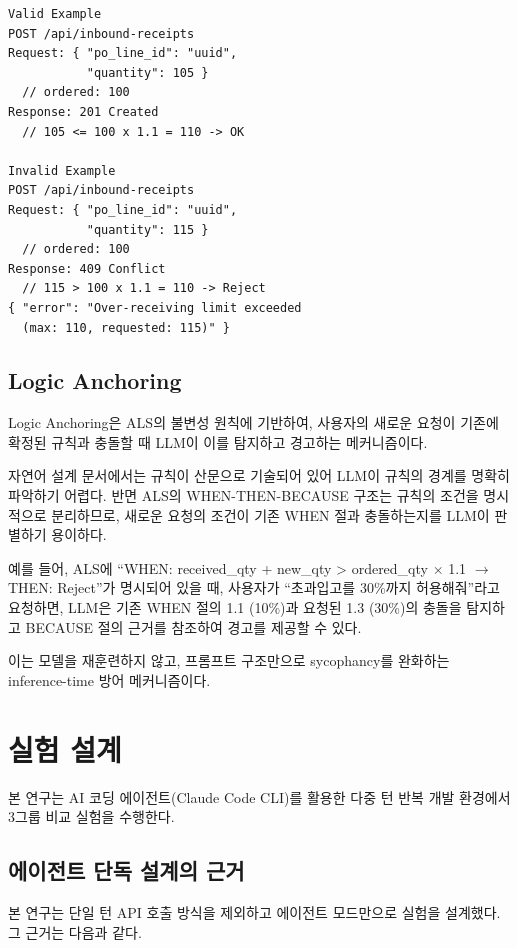 \documentclass[conference]{IEEEtran}
\begin{document}
\begin{lstlisting}
Valid Example
POST /api/inbound-receipts
Request: { "po_line_id": "uuid",
           "quantity": 105 }
  // ordered: 100
Response: 201 Created
  // 105 <= 100 x 1.1 = 110 -> OK

Invalid Example
POST /api/inbound-receipts
Request: { "po_line_id": "uuid",
           "quantity": 115 }
  // ordered: 100
Response: 409 Conflict
  // 115 > 100 x 1.1 = 110 -> Reject
{ "error": "Over-receiving limit exceeded
  (max: 110, requested: 115)" }
\end{lstlisting}

\subsection{Logic Anchoring}

Logic Anchoring은 ALS의 불변성 원칙에 기반하여, 사용자의 새로운 요청이 기존에 확정된 규칙과 충돌할 때 LLM이 이를 탐지하고 경고하는 메커니즘이다.

자연어 설계 문서에서는 규칙이 산문으로 기술되어 있어 LLM이 규칙의 경계를 명확히 파악하기 어렵다. 반면 ALS의 WHEN-THEN-BECAUSE 구조는 규칙의 조건을 명시적으로 분리하므로, 새로운 요청의 조건이 기존 WHEN 절과 충돌하는지를 LLM이 판별하기 용이하다.

예를 들어, ALS에 ``WHEN: received\_qty + new\_qty > ordered\_qty $\times$ 1.1 $\rightarrow$ THEN: Reject''가 명시되어 있을 때, 사용자가 ``초과입고를 30\%까지 허용해줘''라고 요청하면, LLM은 기존 WHEN 절의 1.1 (10\%)과 요청된 1.3 (30\%)의 충돌을 탐지하고 BECAUSE 절의 근거를 참조하여 경고를 제공할 수 있다.

이는 모델을 재훈련하지 않고, 프롬프트 구조만으로 sycophancy를 완화하는 inference-time 방어 메커니즘이다.

\section{실험 설계}

본 연구는 AI 코딩 에이전트(Claude Code CLI)를 활용한 다중 턴 반복 개발 환경에서 3그룹 비교 실험을 수행한다.

\subsection{에이전트 단독 설계의 근거}

본 연구는 단일 턴 API 호출 방식을 제외하고 에이전트 모드만으로 실험을 설계했다. 그 근거는 다음과 같다.
\end{document}
